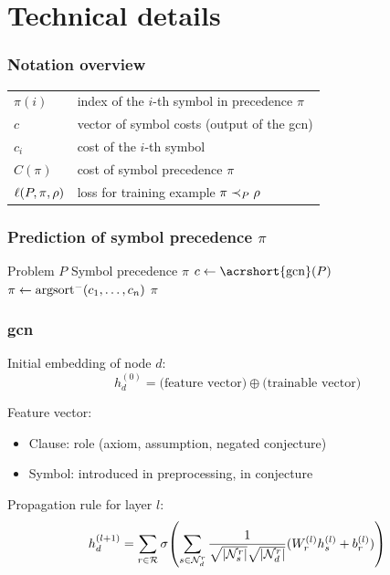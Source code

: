 \documentclass[a4paper]{beamer}
\begin{document}
\section{Technical details}

\begin{frame}
\frametitle{Notation overview}
\begin{center}
\begin{tabular}{ll}
$\pi(i)$ & index of the $i$-th symbol in precedence $\pi$ \\
$c$ & vector of symbol costs (output of the \acrshort{gcn}) \\
$c_i$ & cost of the $i$-th symbol \\
$C(\pi)$ & cost of symbol precedence $\pi$ \\
$\ell(P, \pi, \rho)$ & loss for training example $\pi \prec_{P} \rho$ \\
\end{tabular}
\end{center}
\end{frame}

\begin{frame}
\frametitle{Prediction of symbol precedence $\pi$}
\begin{algorithmic} %
\REQUIRE Problem $P$
\ENSURE Symbol precedence $\pi$
\STATE $c \gets \mathrm{\acrshort{gcn}}(P)$
\STATE $\pi \gets \operatorname{argsort}^- (c_1, \ldots, c_n)$
\RETURN $\pi$
\end{algorithmic}
\end{frame}

\begin{frame}
\frametitle{\Acrfull{gcn}}

Initial embedding of node $d$:
$$
h_d^{(0)} = \textrm{(feature vector)} \oplus \textrm{(trainable vector)}
$$

Feature vector:
\begin{itemize}
\item Clause: role (axiom, assumption, negated conjecture)
\item Symbol: introduced in preprocessing, in conjecture
\end{itemize}

Propagation rule for layer $l$:
$$
h_d^{(l+1)} =
\sum_{r \in \mathcal{R}} \sigma \Parentheses*{\sum_{s \in \mathcal{N}_d^r} \frac{1}{\sqrt{\card{\mathcal{N}_s^r}} \sqrt{\card{\mathcal{N}_d^r}}} (W_r^{(l)} h_s^{(l)} + b_r^{(l)})}
$$

\end{frame}
\end{document}
